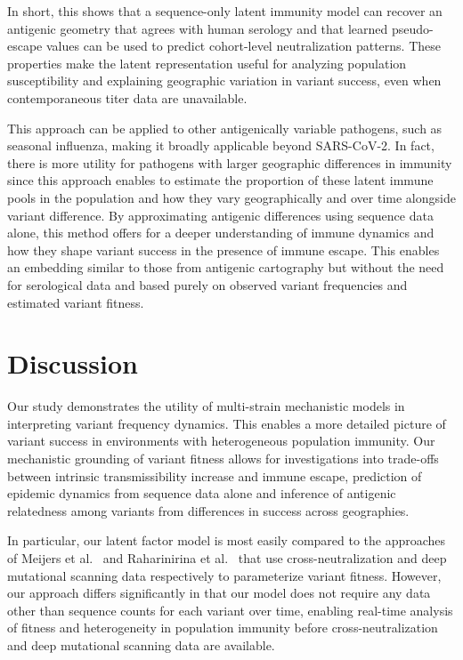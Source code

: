 \documentclass[11pt,oneside,letterpaper]{article}
\begin{document}
In short, this shows that a sequence-only latent immunity model can recover an antigenic geometry that agrees with human serology and that learned pseudo-escape values can be used to predict cohort-level neutralization patterns.
These properties make the latent representation useful for analyzing population susceptibility and explaining geographic variation in variant success, even when contemporaneous titer data are unavailable.

This approach can be applied to other antigenically variable pathogens, such as seasonal influenza, making it broadly applicable beyond SARS-CoV-2.
In fact, there is more utility for pathogens with larger geographic differences in immunity since this approach enables to estimate the proportion of these latent immune pools in the population and how they vary geographically and over time alongside variant difference.
By approximating antigenic differences using sequence data alone, this method offers for a deeper understanding of immune dynamics and how they shape variant success in the presence of immune escape.
This enables an embedding similar to those from antigenic cartography but without the need for serological data and based purely on observed variant frequencies and estimated variant fitness.

\section*{Discussion}

Our study demonstrates the utility of multi-strain mechanistic models in interpreting variant frequency dynamics.
This enables a more detailed picture of variant success in environments with heterogeneous population immunity.
Our mechanistic grounding of variant fitness allows for investigations into trade-offs between intrinsic transmissibility increase and immune escape, prediction of epidemic dynamics from sequence data alone and inference of antigenic relatedness among variants from differences in success across geographies.

In particular, our latent factor model is most easily compared to the approaches of Meijers et al.\ \cite{Meijers2023} and Raharinirina et al.\ \cite{Raharinirina2025} that use cross-neutralization and deep mutational scanning data respectively to parameterize variant fitness.
However, our approach differs significantly in that our model does not require any data other than sequence counts for each variant over time, enabling real-time analysis of fitness and heterogeneity in population immunity before cross-neutralization and deep mutational scanning data are available.
\end{document}
